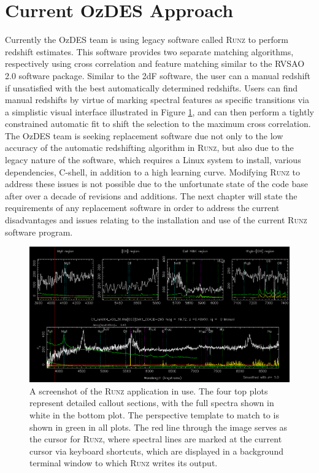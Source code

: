 \documentclass[titlesmallcaps, examinerscopy, copyrightpage]{uqthesis}
\newcommand{\runz}{\textsc{Runz}}
\begin{document}
\section{Current OzDES Approach}

Currently the OzDES team is using legacy software called \textsc{Runz} to perform redshift estimates. This software provides two separate matching algorithms, respectively using cross correlation and feature matching similar to the RVSAO 2.0 software package. Similar to the 2dF software, the user can a manual redshift if unsatisfied with the best automatically determined redshifts. Users can find manual redshifts by virtue of marking spectral features as specific transitions via a simplistic visual interface illustrated in Figure \ref{fig:runz}, and can then perform a tightly constrained  automatic fit to shift the selection to the maximum cross correlation. The OzDES team is seeking replacement software due not only to the low accuracy of the automatic redshifting algorithm in \textsc{Runz}, but also due to the legacy nature of the software, which requires a Linux system to install, various dependencies, C-shell, in addition to a high learning curve. Modifying \textsc{Runz} to address these issues is not possible due to the unfortunate state of the code base after over a decade of revisions and additions. The next chapter will state the requirements of any replacement software in order to address the current disadvantages and issues relating to the installation and use of the current \textsc{Runz} software program.

\begin{figure}[ht!]
\includegraphics[width=1\textwidth]{images/RunzScreen.PNG} 
\centering
\caption{A screenshot of the \runz{} application in use. The four top plots represent detailed callout sections, with the full spectra shown in white in the bottom plot. The perspective template to match to is shown in green in all plots. The red line through the image serves as the cursor for \runz{}, where spectral lines are marked at the current cursor via keyboard shortcuts, which are displayed in a background terminal window to which \runz{} writes its output.}
\label{fig:runz}
\end{figure}
\end{document}
